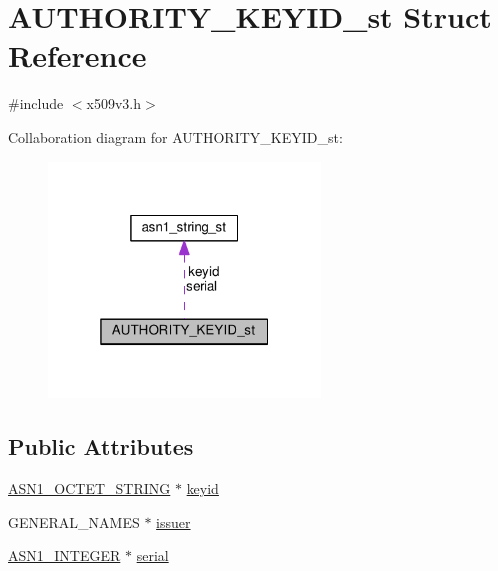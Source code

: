 \hypertarget{struct_a_u_t_h_o_r_i_t_y___k_e_y_i_d__st}{}\section{A\+U\+T\+H\+O\+R\+I\+T\+Y\+\_\+\+K\+E\+Y\+I\+D\+\_\+st Struct Reference}
\label{struct_a_u_t_h_o_r_i_t_y___k_e_y_i_d__st}


{\ttfamily \#include $<$x509v3.\+h$>$}



Collaboration diagram for A\+U\+T\+H\+O\+R\+I\+T\+Y\+\_\+\+K\+E\+Y\+I\+D\+\_\+st\+:
\nopagebreak
\begin{figure}[H]
\begin{center}
\leavevmode
\includegraphics[width=205pt]{struct_a_u_t_h_o_r_i_t_y___k_e_y_i_d__st__coll__graph}
\end{center}
\end{figure}
\subsection*{Public Attributes}
\begin{DoxyCompactItemize}
\item 
\hyperlink{ossl__typ_8h_afbd05e94e0f0430a2b729473efec88c1}{A\+S\+N1\+\_\+\+O\+C\+T\+E\+T\+\_\+\+S\+T\+R\+I\+NG} $\ast$ \hyperlink{struct_a_u_t_h_o_r_i_t_y___k_e_y_i_d__st_ad9aea22a1fc62bcf0669f7feba4e38a7}{keyid}
\item 
G\+E\+N\+E\+R\+A\+L\+\_\+\+N\+A\+M\+ES $\ast$ \hyperlink{struct_a_u_t_h_o_r_i_t_y___k_e_y_i_d__st_a3a750d3a2a795e1a0dfb98f0e16bf339}{issuer}
\item 
\hyperlink{ossl__typ_8h_af4335399bf9774cb410a5e93de65998b}{A\+S\+N1\+\_\+\+I\+N\+T\+E\+G\+ER} $\ast$ \hyperlink{struct_a_u_t_h_o_r_i_t_y___k_e_y_i_d__st_a266ae5a8b48cee3727995cf791bc7d8c}{serial}
\end{DoxyCompactItemize}


